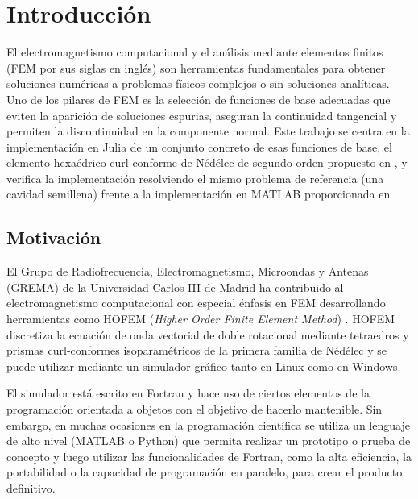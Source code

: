 \documentclass[12pt]{report} %
\newcommand{\paginacortesia}{%
	\newpage
	\thispagestyle{empty}
	\mbox{}
}
\begin{document}
\paginacortesia


\clearpage
{}

\chapter{Introducción}\label{cap:introduccion}
El electromagnetismo computacional y el análisis mediante elementos finitos (FEM por sus siglas en inglés) son herramientas fundamentales para obtener soluciones numéricas a problemas físicos complejos o sin soluciones analíticas. Uno de los pilares de FEM es la selección de funciones de base adecuadas que eviten la aparición de soluciones espurias, aseguran la continuidad tangencial y permiten la discontinuidad en la componente normal. Este trabajo se centra en la implementación en Julia de un conjunto concreto de esas funciones de base, el elemento hexaédrico curl-conforme de Nédélec de segundo orden
propuesto en \cite{amor2023hexahedral}, y verifica la implementación resolviendo el mismo problema de referencia (una cavidad semillena) frente a la implementación en MATLAB proporcionada en \cite{amor2022zenodo}

\section{Motivación}\label{sec:motivacion}
El Grupo de Radiofrecuencia, Electromagnetismo, Microondas y Antenas
(GREMA) de la Universidad Carlos III de Madrid ha contribuido al electromagnetismo computacional con especial énfasis en FEM desarrollando herramientas como HOFEM (\emph{Higher Order
Finite Element Method}) \cite{garciadonoro2015hofem}. HOFEM discretiza
la ecuación de onda vectorial de doble rotacional mediante tetraedros y prismas
curl-conformes isoparamétricos de la primera familia de N\'ed\'elec y se puede utilizar mediante un simulador gráfico tanto en Linux como en Windows.

El simulador está escrito en Fortran y hace uso de ciertos elementos de la programación orientada a objetos con el objetivo de hacerlo mantenible. Sin embargo, en muchas ocasiones en la programación científica se utiliza un lenguaje de alto nivel (MATLAB o Python) que permita realizar un prototipo o prueba de concepto y luego utilizar las funcionalidades de Fortran, como la alta eficiencia, la portabilidad o la capacidad de programación en paralelo, para crear el producto definitivo.
\end{document}
